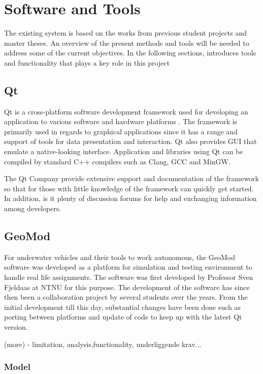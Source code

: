 \chapter{Software and Tools}
\label{existing_tech}

The existing system is based on the works from previous student projects and master theses. An overview of the present methods and tools will be needed to address some of the current objectives. In the following sections, introduces tools and functionality that plays a key role in this project

\section{Qt}

Qt is a cross-platform software development framework used for developing an application to various software and hardware platforms \cite{qt}. The framework is primarily used in regards to graphical applications since it has a range and support of tools for data presentation and interaction. Qt also provides GUI that emulate a native-looking interface. Application and libraries using Qt can be compiled by standard C++ compilers such as Clang, GCC and MinGW. 

The Qt Company provide extensive support and documentation of the framework so that for those with little knowledge of the framework can quickly get started. In addition, is it plenty of discussion forums for help and exchanging information among developers.


\section{GeoMod}

For underwater vehicles and their tools to work autonomous, the GeoMod software was developed as a platform for simulation and testing environment to handle real life assignments. The software was first developed by Professor Sven Fjeldaas at NTNU for this purpose. The development of the software has since then been a collaboration project by several students over the years. From the initial development till this day, substantial changes have been done such as porting between platforms and update of code to keep up with the latest Qt version.

(more) - limitation, analysis,functionality, underliggende krav...


\subsection{Model}
\label{chap:model}

